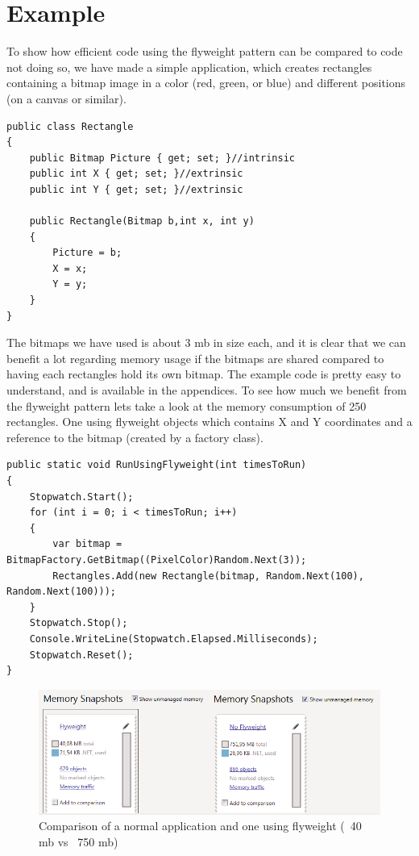 \section{Example}
To show how efficient code using the flyweight pattern can be compared to code not doing so, we have made a simple application, which creates rectangles containing a bitmap image in a color (red, green, or blue) and different positions (on a canvas or similar).
\lstset{language=C++}
\begin{lstlisting}[caption=The rectangle class]
public class Rectangle
{
	public Bitmap Picture { get; set; }//intrinsic
	public int X { get; set; }//extrinsic
	public int Y { get; set; }//extrinsic

	public Rectangle(Bitmap b,int x, int y)
	{
		Picture = b;
		X = x;
		Y = y;
	}
}
\end{lstlisting}
The bitmaps we have used is about 3 mb in size each, and it is clear that we can benefit a lot regarding memory usage if the bitmaps are shared compared to having each rectangles hold its own bitmap.
The example code is pretty easy to understand, and is available in the appendices.
To see how much we benefit from the flyweight pattern lets take a look at the memory consumption of 250 rectangles. One using flyweight objects which contains X and Y coordinates and a reference to the bitmap (created by a factory class).
\lstset{language=C++}
\begin{lstlisting}[caption=The "testrun" using flyweight]
public static void RunUsingFlyweight(int timesToRun)
{
	Stopwatch.Start();
	for (int i = 0; i < timesToRun; i++)
	{
		var bitmap = BitmapFactory.GetBitmap((PixelColor)Random.Next(3));
		Rectangles.Add(new Rectangle(bitmap, Random.Next(100), Random.Next(100)));
	}
	Stopwatch.Stop();
	Console.WriteLine(Stopwatch.Elapsed.Milliseconds);
	Stopwatch.Reset();
}
\end{lstlisting}
\begin{figure}[h]
\centering
\includegraphics[width=0.7\linewidth]{Content/Flyweight_Stats}
\caption{Comparison of a normal application and one using flyweight (~40 mb vs ~750 mb)}
\label{fig:Flyweight_Stats}
\end{figure}
